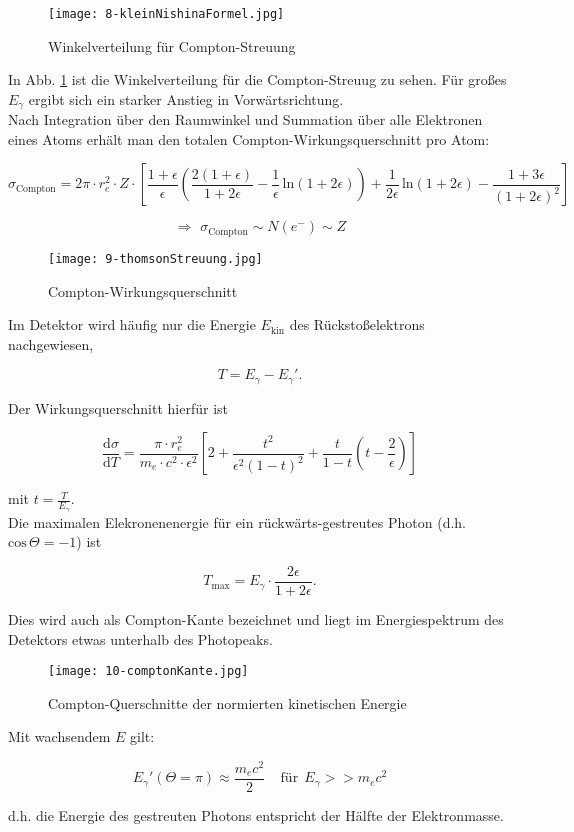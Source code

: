 \begin{figure}[H]
	\centering
	\texttt{[image: 8-kleinNishinaFormel.jpg]}
	\caption{Winkelverteilung für Compton-Streuung}
	\label{kleinnishina}
\end{figure}

In Abb. \ref{kleinnishina} ist die Winkelverteilung für die Compton-Streuug zu sehen. Für großes
$E_\gamma$ ergibt sich ein starker Anstieg in Vorwärtsrichtung.
\\
Nach Integration über den Raumwinkel und Summation über alle Elektronen eines Atoms erhält man den
totalen Compton-Wirkungsquerschnitt pro Atom:

\[\sigma_{\text{Compton}} = 2\pi \cdot r_e^2\cdot Z \cdot
\left[\frac{1+\epsilon}{\epsilon}\left( \frac{2(1+\epsilon)}{1+2\epsilon} -
\frac{1}{\epsilon}\,\text{ln}(1+2\epsilon) \right) + \frac{1}{2\epsilon}\,\text{ln}(1+2\epsilon) -
\frac{1+3\epsilon}{(1+2\epsilon)^2} \right] \]

\[\Rightarrow\,\, \sigma_{\text{Compton}} \sim N(e^-) \sim Z  \]

\begin{figure}[H]
	\centering
	\texttt{[image: 9-thomsonStreuung.jpg]}
	\caption{Compton-Wirkungsquerschnitt}
	\label{comptonwq}
\end{figure}

Im Detektor wird häufig nur die Energie $E_{\text{kin}}$ des Rückstoßelektrons nachgewiesen,

\[T= E_\gamma -E_\gamma'.  \]

Der Wirkungsquerschnitt hierfür ist

\[\frac{\mathrm{d}\sigma}{\mathrm{d}T} = \frac{\pi\cdot r_e^2}{m_e\cdot c^2\cdot \epsilon^2} \left[
2+ \frac{t^2}{\epsilon^2(1-t)^2} +\frac{t}{1-t}\left(t-\frac{2}{\epsilon} \right) \right] \]

mit $t=\frac{T}{E_\gamma}$.
\\
Die maximalen Elekronenenergie für ein rückwärts-gestreutes Photon (d.h. $\text{cos}\,\Theta=-1$)
ist

\[T_{\text{max}} = E_\gamma\cdot \frac{2\epsilon}{1+2\epsilon}. \] 

Dies wird auch als Compton-Kante bezeichnet und liegt im Energiespektrum des Detektors etwas
unterhalb des Photopeaks.

\begin{figure}[H]
	\centering
	\texttt{[image: 10-comptonKante.jpg]}
	\caption{Compton-Querschnitte der normierten kinetischen Energie}
	\label{comptonTmax}
\end{figure}

Mit wachsendem $E$ gilt:

\[E_\gamma'(\Theta=\pi) \approx \frac{m_ec^2}{2}~~~~~\text{für}~~E_\gamma>>m_ec^2  \]

d.h. die Energie des gestreuten Photons entspricht der Hälfte der Elektronmasse.